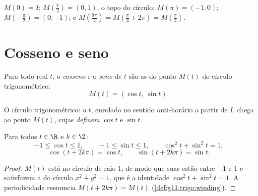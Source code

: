 \begin{example}
$M(0) = I$; $M\!\left(\frac{\pi}{2}\right) = (0, 1)$, o topo do círculo;
$M(\pi) = (-1, 0)$; $M\!\left(-\frac{\pi}{2}\right) = (0, -1)$; e
$M\!\left(\frac{9\pi}{4}\right) = M\!\left(\frac{\pi}{4} +
2\pi\right) = M\!\left(\frac{\pi}{4}\right)$.
\end{example}

\section{Cosseno e seno}

\begin{definition}\label{def:g11:trigo:cossin}
Para todo real $t$, o \emph{cosseno} e o
\emph{seno} de $t$ são as  do ponto $M(t)$ do
círculo trigonométrico:
\[
M(t) = (\cos t,\ \sin t).
\]
\end{definition}

\begin{omfigure}

{\small O círculo trigonométrico: o  $t$, enrolado no sentido
anti-horário a partir de $I$, chega ao ponto $M(t)$, cujas 
\emph{definem} $\cos t$ e $\sin t$.}
\end{omfigure}

\begin{proposition}\label{prop:g11:trigo:first}
Para todos $t \in \R$ e $k \in \Z$:
\[
-1 \leq \cos t \leq 1, \qquad
-1 \leq \sin t \leq 1, \qquad
\cos^2 t + \sin^2 t = 1,
\]
\[
\cos(t + 2k\pi) = \cos t, \qquad \sin(t + 2k\pi) = \sin t .
\]
\end{proposition}

\begin{proof}
$M(t)$ está no círculo de raio $1$, de modo que suas  estão
entre $-1$ e $1$ e satisfazem a  do círculo $x^2 + y^2 = 1$, que é
a identidade $\cos^2 t + \sin^2 t = 1$. A periodicidade reenuncia
$M(t + 2k\pi) = M(t)$ (\cref{def:g11:trigo:winding}).
\end{proof}

